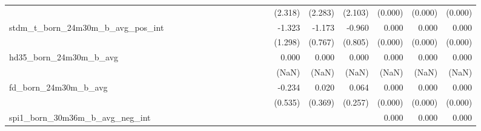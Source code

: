 \begin{tabular}{lrrrrrrrrrrrrrrrrrr}
                                            &              &              &              &              &              &              &              &              &               &              &              &               &      (2.318) &      (2.283) &       (2.103) &      (0.000) &      (0.000) &       (0.000) \\ 
stdm\_t\_born\_24m30m\_b\_avg\_pos\_int     &              &              &              &              &              &              &              &              &               &              &              &               &       -1.323 &       -1.173 &        -0.960 &        0.000 &        0.000 &         0.000 \\ 
                                            &              &              &              &              &              &              &              &              &               &              &              &               &      (1.298) &      (0.767) &       (0.805) &      (0.000) &      (0.000) &       (0.000) \\ 
hd35\_born\_24m30m\_b\_avg                  &              &              &              &              &              &              &              &              &               &              &              &               &        0.000 &        0.000 &         0.000 &        0.000 &        0.000 &         0.000 \\ 
                                            &              &              &              &              &              &              &              &              &               &              &              &               &        (NaN) &        (NaN) &         (NaN) &        (NaN) &        (NaN) &         (NaN) \\ 
fd\_born\_24m30m\_b\_avg                    &              &              &              &              &              &              &              &              &               &              &              &               &       -0.234 &        0.020 &         0.064 &        0.000 &        0.000 &         0.000 \\ 
                                            &              &              &              &              &              &              &              &              &               &              &              &               &      (0.535) &      (0.369) &       (0.257) &      (0.000) &      (0.000) &       (0.000) \\ 
spi1\_born\_30m36m\_b\_avg\_neg\_int        &              &              &              &              &              &              &              &              &               &              &              &               &              &              &               &        0.000 &        0.000 &         0.000 \\ 

\end{tabular}
